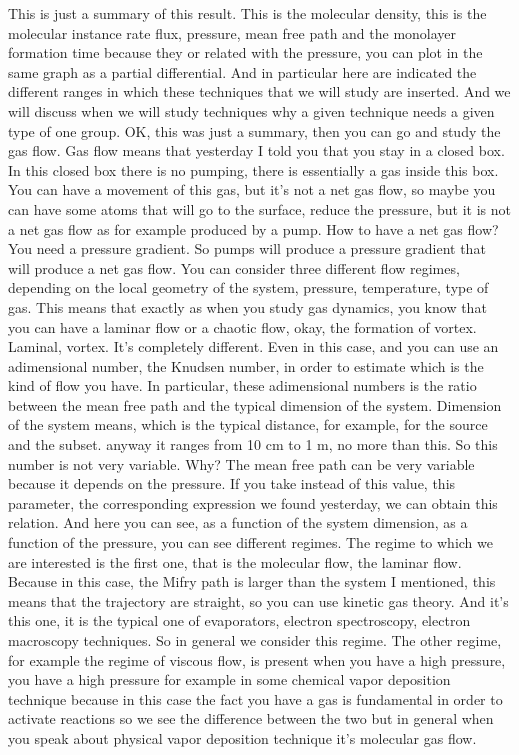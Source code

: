 This is just a summary of this result. This is the molecular density, this is the molecular instance rate flux, pressure, mean free path and the monolayer formation time because they or related with the pressure, you can plot in the same graph as a partial differential. And in particular here are indicated the different ranges in which these techniques that we will study are inserted. And we will discuss when we will study techniques why a given technique needs a given type of one group. OK, this was just a summary, then you can go and study the gas flow. Gas flow means that yesterday I told you that you stay in a closed box. In this closed box there is no pumping, there is essentially a gas inside this box. You can have a movement of this gas, but it's not a net gas flow, so maybe you can have some atoms that will go to the surface, reduce the pressure, but it is not a net gas flow as for example produced by a pump. How to have a net gas flow? You need a pressure gradient. So pumps will produce a pressure gradient that will produce a net gas flow. You can consider three different flow regimes, depending on the local geometry of the system, pressure, temperature, type of gas. This means that exactly as when you study gas dynamics, you know that you can have a laminar flow or a chaotic flow, okay, the formation of vortex. Laminal, vortex. It's completely different. Even in this case, and you can use an adimensional number, the Knudsen number, in order to estimate which is the kind of flow you have. In particular, these adimensional numbers is the ratio between the mean free path and the typical dimension of the system. Dimension of the system means, which is the typical distance, for example, for the source and the subset. anyway it ranges from 10 cm to 1 m, no more than this. So this number is not very variable. Why? The mean free path can be very variable because it depends on the pressure. If you take instead of this value, this parameter, the corresponding expression we found yesterday, we can obtain this relation. And here you can see, as a function of the system dimension, as a function of the pressure, you can see different regimes. The regime to which we are interested is the first one, that is the molecular flow, the laminar flow. Because in this case, the Mifry path is larger than the system I mentioned, this means that the trajectory are straight, so you can use kinetic gas theory. And it's this one, it is the typical one of evaporators, electron spectroscopy, electron macroscopy techniques. So in general we consider this regime. The other regime, for example the regime of viscous flow, is present when you have a high pressure, you have a high pressure for example in some chemical vapor deposition technique because in this case the fact you have a gas is fundamental in order to activate reactions so we see the difference between the two but in general when you speak about physical vapor deposition technique it's molecular gas flow.

